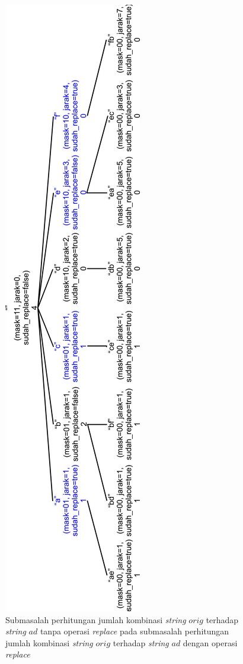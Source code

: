 \begin{figure}
	\centerline{ \includegraphics[scale=0.25]{assets/images/new/jpg/subproblem2-tipe1-rotated.jpg}}
	\caption{Submasalah perhitungan jumlah kombinasi \textit{string} $ orig $ terhadap \textit{string} $ ad $ tanpa operasi \textit{replace} pada submasalah perhitungan jumlah kombinasi \textit{string} $ orig $ terhadap \textit{string} $ ad $ dengan operasi \textit{replace}}
	\label{figure:submasalah_1_pada_submasalah_2}
\end{figure}


